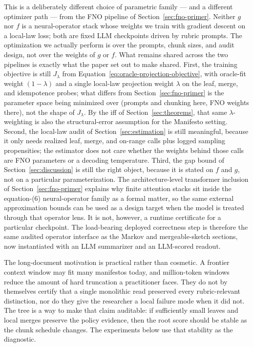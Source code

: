 This is a deliberately different choice of parametric family --- and a
different optimizer path --- from the FNO pipeline of
Section~\ref{sec:fno-primer}. Neither $g$ nor $f$ is a neural-operator
stack whose weights we train with gradient descent on a local-law loss;
both are fixed LLM checkpoints driven by rubric prompts. The
optimization we actually perform is over the prompts, chunk sizes, and
audit design, not over the weights of $g$ or $f$. What remains shared
across the two pipelines is exactly what the paper set out to make
shared. First, the training objective is still
$J_\lambda$ from Equation~\eqref{eq:oracle-projection-objective}, with
oracle-fit weight $(1-\lambda)$ and a single local-law projection
weight $\lambda$ on the leaf, merge, and idempotence probes; what
differs from Section~\ref{sec:fno-primer} is the parameter space being
minimized over (prompts and chunking here, FNO weights there), not the
shape of $J_\lambda$. By the iff of Section~\ref{sec:theorems}, that
same $\lambda$-weighting is also the structural-error assumption for
the Manifesto setting. Second, the local-law audit of
Section~\ref{sec:estimation} is still meaningful, because it only needs
realized leaf, merge, and on-range calls plus logged sampling
propensities; the estimator does not care whether the weights behind
those calls are FNO parameters or a decoding temperature. Third, the
gap bound of Section~\ref{sec:discussion} is still the right object,
because it is stated on $f$ and $g$, not on a particular
parameterization. The architecture-level transformer inclusion of
Section~\ref{sec:fno-primer} explains why finite attention stacks sit
inside the equation-(6) neural-operator family as a formal matter, so
the same external approximation bounds can be used as a design target
when the model is treated through that operator lens. It is not,
however, a runtime certificate for a particular checkpoint. The
load-bearing deployed correctness step is therefore the same audited
operator interface as the Markov and mergeable-sketch sections, now
instantiated with an LLM summarizer and an LLM-scored readout.

The long-document motivation is practical rather than cosmetic. A
frontier context window may fit many manifestos today, and million-token
windows reduce the amount of hard truncation a practitioner faces. They do
not by themselves certify that a single monolithic read preserved every
rubric-relevant distinction, nor do they give the researcher a local
failure mode when it did not. The tree is a way to make that claim
auditable: if sufficiently small leaves and local merges preserve the
policy evidence, then the root score should be stable as the chunk
schedule changes. The experiments below use that stability as the
diagnostic.

